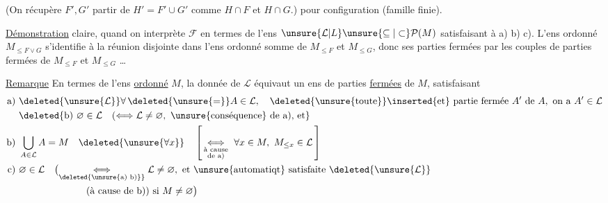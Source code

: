 
(On récupère $F',G'$  partir de $H'=F'\cup G'$ comme $H\cap F$ et $H\cap G$.)  pour    configuration (famille   finie).

\uline{Démonstration}  claire, quand on interprète $\mathcal F$ en termes de l'ens $\unsure{\mathcal L|L}\unsure{\subseteq|\subset}\mathcal P(M)$ satisfaisant à a) b) c). L'ens ordonné $M_{\leq F\vee G}$ s'identifie à la réunion disjointe dans l'ens ordonné somme de $M_{\leq F}$ et $M_{\leq G}$, donc ses parties fermées    par les couples de parties fermées de $M_{\leq F}$ et $M_{\leq G}$ \ldots

\uline{Remarque}
En termes de l'ens \uline{ordonné} $M$, la donnée de $\mathcal L$ équivaut  un ens de parties \uline{fermées} de $M$, satisfaisant
\[
\begin{aligned}
\text{a) }&\deleted{\unsure{\mathcal L}}\forall\,\deleted{\unsure{=}}A\in\mathcal L,\quad
 \deleted{\text{\unsure{toute}}}\inserted{\text{et}}\ \text{partie fermée }A'\text{ de }A,\ \text{on a }A'\in\mathcal L\\
&\deleted{\text{b) }\varnothing\in\mathcal L\quad
 (\Longleftrightarrow\mathcal L\ne\varnothing,\ \text{\unsure{conséquence} de a), et}}\\
\text{b) }&\bigcup_{A\in\mathcal L} A=M\quad\deleted{\unsure{\forall x}}\quad
 \left[\,\underset{\substack{\text{à cause}\\\text{de a)}}}{\Longleftrightarrow}\
 \forall x\in M,\ M_{\leq x}\in\mathcal L\,\right]\\
\text{c) }&\varnothing\in\mathcal L\quad
 \bigl(\underset{\deleted{\unsure{\text{a) b)}}}}{\Longleftrightarrow}
 \mathcal L\ne\varnothing,\ \text{et \unsure{automatiqt} satisfaite}\ \deleted{\unsure{\mathcal L}}\\
 &\hspace{7em}\text{(à cause de b)) si }M\ne\varnothing\bigr)
\end{aligned}
\]

